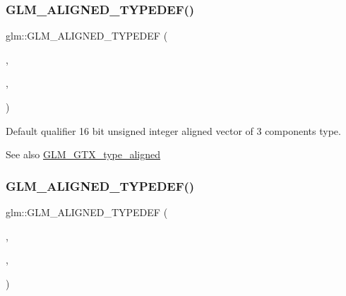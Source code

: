 \subsubsection{\texorpdfstring{G\+L\+M\+\_\+\+A\+L\+I\+G\+N\+E\+D\+\_\+\+T\+Y\+P\+E\+D\+E\+F()}{GLM\_ALIGNED\_TYPEDEF()}\hspace{0.1cm}{\footnotesize\ttfamily [127/209]}}
{\footnotesize\ttfamily glm\+::\+G\+L\+M\+\_\+\+A\+L\+I\+G\+N\+E\+D\+\_\+\+T\+Y\+P\+E\+D\+EF (\begin{DoxyParamCaption}\item[{\hyperlink{group__gtc__type__precision_gad60f14d1abd39b480cbe5c5cf848071a}{u16vec3}}]{,  }\item[{aligned\+\_\+u16vec3}]{,  }\item[{8}]{ }\end{DoxyParamCaption})}

Default qualifier 16 bit unsigned integer aligned vector of 3 components type. \begin{DoxySeeAlso}{See also}
\hyperlink{group__gtx__type__aligned}{G\+L\+M\+\_\+\+G\+T\+X\+\_\+type\+\_\+aligned} 
\end{DoxySeeAlso}
\mbox{\label{group__gtx__type__aligned_gaecafb5996f5a44f57e34d29c8670741e}} 
\subsubsection{\texorpdfstring{G\+L\+M\+\_\+\+A\+L\+I\+G\+N\+E\+D\+\_\+\+T\+Y\+P\+E\+D\+E\+F()}{GLM\_ALIGNED\_TYPEDEF()}\hspace{0.1cm}{\footnotesize\ttfamily [128/209]}}
{\footnotesize\ttfamily glm\+::\+G\+L\+M\+\_\+\+A\+L\+I\+G\+N\+E\+D\+\_\+\+T\+Y\+P\+E\+D\+EF (\begin{DoxyParamCaption}\item[{\hyperlink{group__gtc__type__precision_ga049d45ad8d0f78578d7ceb86a7fdaae4}{u16vec4}}]{,  }\item[{aligned\+\_\+u16vec4}]{,  }\item[{8}]{ }\end{DoxyParamCaption})}

